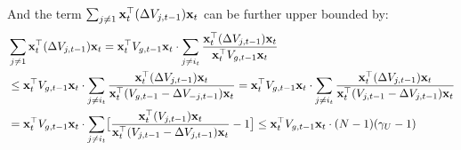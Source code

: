 And the term $\sum_{j\neq 1} \mathbf{x}_{t}^{\top}(\Delta{V}_{j,t-1})\mathbf{x}_{t}$ can be further upper bounded by:
\begin{align*}
    & \sum_{j\neq 1} \mathbf{x}_{t}^{\top}(\Delta{V}_{j,t-1})\mathbf{x}_{t} = \mathbf{x}_{t}^{\top} V_{g,t-1} \mathbf{x}_{t} \cdot \sum_{j \neq i_{t}}  \frac{\mathbf{x}_{t}^{\top}(\Delta{V}_{j,t-1})\mathbf{x}_{t}}{\mathbf{x}_{t}^{\top} V_{g,t-1} \mathbf{x}_{t}}  \\
    & \leq \mathbf{x}_{t}^{\top} V_{g,t-1} \mathbf{x}_{t}\cdot  \sum_{j \neq i_{t}} \frac{\mathbf{x}_{t}^{\top}(\Delta{V}_{j,t-1})\mathbf{x}_{t}}{\mathbf{x}_{t}^{\top} (V_{g,t-1}-\Delta{V}_{-j,t-1}) \mathbf{x}_{t}}  = \mathbf{x}_{t}^{\top} V_{g,t-1} \mathbf{x}_{t}\cdot  \sum_{j \neq i_{t}} \frac{\mathbf{x}_{t}^{\top}(\Delta{V}_{j,t-1})\mathbf{x}_{t}}{\mathbf{x}_{t}^{\top} (V_{j,t-1}-\Delta{V}_{j,t-1}) \mathbf{x}_{t}}  \\
    & = \mathbf{x}_{t}^{\top} V_{g,t-1} \mathbf{x}_{t} \cdot  \sum_{j \neq i_{t}} \bigl[ \frac{\mathbf{x}_{t}^{\top}({V}_{j,t-1})\mathbf{x}_{t}}{\mathbf{x}_{t}^{\top} (V_{j,t-1}-\Delta{V}_{j,t-1}) \mathbf{x}_{t}} -1 \bigr] \leq \mathbf{x}_{t}^{\top} V_{g,t-1} \mathbf{x}_{t} \cdot (N-1)(\gamma_{U}-1)
\end{align*}
